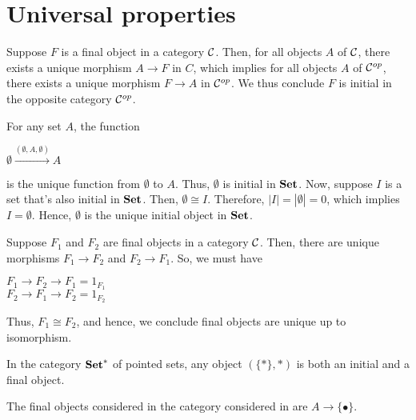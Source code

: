 \begin{xca}
\end{xca}

\section{Universal properties}
\begin{xca}
Suppose $F$ is a final object in a category $\mathcal{C}$. Then, for all objects $A$
of $\mathcal{C}$, there exists a unique morphism $A \to F$ in $C$, which implies for
all objects $A$ of $\mathcal{C}^{op}$, there exists a unique morphism $F \to A$ in
$\mathcal{C}^{op}$. We thus conclude $F$ is initial in the opposite category
$\mathcal{C}^{op}$.
\end{xca}

\begin{xca}
For any set $A$, the function
\begin{center}
    $\emptyset \xrightarrow{(\emptyset, A, \emptyset)} A$
\end{center}
 is the unique
function from $\emptyset$ to $A$. Thus, $\emptyset$ is initial in
$\mathbf{Set}$. Now, suppose $I$ is a set that's also initial in
$\mathbf{Set}$. Then, $\emptyset \cong I$. Therefore, $|I| = |\emptyset| = 0$,
which implies $I = \emptyset$. Hence, $\emptyset$ is the unique initial object
in $\mathbf{Set}$.
\end{xca}

\begin{xca}
Suppose $F_1$ and $F_2$ are final objects in a category $\mathcal{C}$. Then, there
are unique morphisms $F_1 \to F_2$ and $F_2 \to F_1$. So, we must have
\begin{center}
    $F_1 \to F_2 \to F_1 = 1_{F_1}$ \\
    $F_2 \to F_1 \to F_2 = 1_{F_2}$
\end{center}
Thus, $F_1 \cong F_2$, and hence, we conclude final objects are unique up to
isomorphism.
\end{xca}

\begin{xca}
In the category $\mathbf{Set}^*$ of pointed sets, any object $(\{*\}, *)$ is
both an initial and a final object.
\end{xca}

\begin{xca}
The final objects considered in the category considered in  are
$A \to \{ \bullet \}$.
\end{xca}

